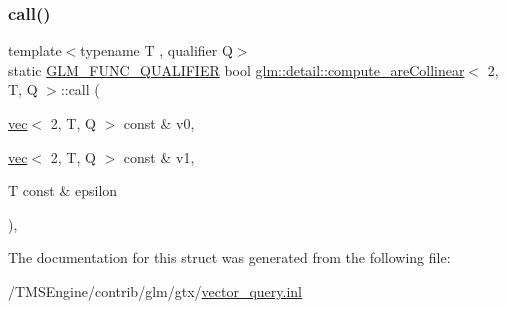 \subsubsection{\texorpdfstring{call()}{call()}}
{\footnotesize\ttfamily template$<$typename T , qualifier Q$>$ \\
static \hyperlink{setup_8hpp_a33fdea6f91c5f834105f7415e2a64407}{G\+L\+M\+\_\+\+F\+U\+N\+C\+\_\+\+Q\+U\+A\+L\+I\+F\+I\+ER} bool \hyperlink{structglm_1_1detail_1_1compute__are_collinear}{glm\+::detail\+::compute\+\_\+are\+Collinear}$<$ 2, T, Q $>$\+::call (\begin{DoxyParamCaption}\item[{\hyperlink{structglm_1_1vec}{vec}$<$ 2, T, Q $>$ const \&}]{v0,  }\item[{\hyperlink{structglm_1_1vec}{vec}$<$ 2, T, Q $>$ const \&}]{v1,  }\item[{T const \&}]{epsilon }\end{DoxyParamCaption})\hspace{0.3cm}{\ttfamily [inline]}, {\ttfamily [static]}}



The documentation for this struct was generated from the following file\+:\begin{DoxyCompactItemize}
\item 
/\+T\+M\+S\+Engine/contrib/glm/gtx/\hyperlink{vector__query_8inl}{vector\+\_\+query.\+inl}\end{DoxyCompactItemize}
